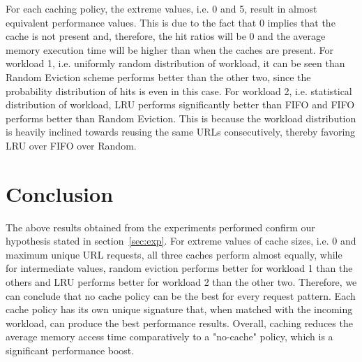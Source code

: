\documentclass[11pt,pdftex,twocolumn]{article}
\begin{document}
For each caching policy, the extreme values, i.e. 0 and 5, result in almost equivalent performance values. This is due to the fact that 0 implies that the cache is not present and, therefore, the hit ratios will be 0 and the average memory execution time will be higher than when the caches are present. For workload 1, i.e. uniformly random distribution of workload, it can be seen than Random Eviction scheme performs better than the other two, since the probability distribution of hits is even in this case. For workload 2, i.e. statistical distribution of workload, LRU performs significantly better than FIFO and FIFO performs better than Random Eviction. This is because the workload distribution is heavily inclined towards reusing the same URLs consecutively, thereby favoring LRU over FIFO over Random.

\section{Conclusion}
The above results obtained from the experiments performed confirm our hypothesis stated in section~\ref{sec:exp}. For extreme values of cache sizes, i.e. 0 and maximum unique URL requests, all three caches perform almost equally, while for intermediate values, random eviction performs better for workload 1 than the others and LRU performs better for workload 2 than the other two. Therefore, we can conclude that no cache policy can be the best for every request pattern. Each cache policy has its own unique signature that, when matched with the incoming workload, can produce the best performance results. Overall, caching reduces the average memory access time comparatively to a "no-cache" policy, which is a significant performance boost.
\end{document}
